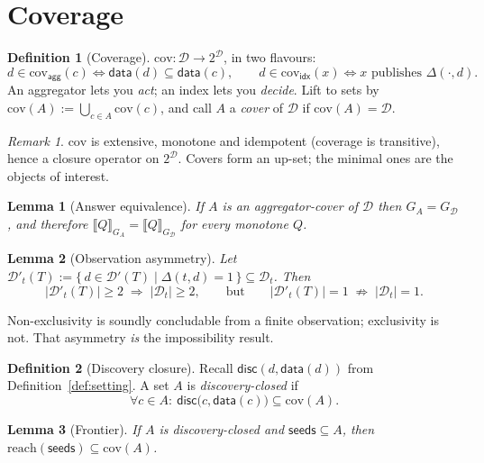 \documentclass[11pt,a4paper]{article}
\theoremstyle{definition}
\newtheorem{definition}{Definition}
\theoremstyle{plain}
\newtheorem{lemma}{Lemma}
\theoremstyle{remark}
\newtheorem*{remark}{Remark}
\newcommand{\Dd}{\mathcal{D}}
\newcommand{\dataf}{\mathsf{data}}
\newcommand{\disc}{\mathsf{disc}}
\newcommand{\ev}[2]{\llbracket #1 \rrbracket_{#2}}
\begin{document}
\section{Coverage}

\begin{definition}[Coverage]
$\mathrm{cov} : \Dd \to 2^{\Dd}$, in two flavours:
\[
  d \in \mathrm{cov}_{\mathsf{agg}}(c) \iff \dataf(d) \subseteq \dataf(c),
  \qquad
  d \in \mathrm{cov}_{\mathsf{idx}}(x) \iff x \text{ publishes } \Delta(\cdot,d).
\]
An aggregator lets you \emph{act}; an index lets you \emph{decide}. Lift to sets by
$\mathrm{cov}(A) := \bigcup_{c \in A}\mathrm{cov}(c)$, and call $A$ a \emph{cover} of
$\Dd$ if $\mathrm{cov}(A) = \Dd$.
\end{definition}

\begin{remark}
$\mathrm{cov}$ is extensive, monotone and idempotent (coverage is transitive), hence a
closure operator on $2^{\Dd}$. Covers form an up-set; the minimal ones are the objects
of interest.
\end{remark}

\begin{lemma}[Answer equivalence]
If $A$ is an aggregator-cover of $\Dd$ then $G_A = G_{\Dd}$, and therefore
$\ev{Q}{G_A} = \ev{Q}{G_{\Dd}}$ for every monotone $Q$.
\end{lemma}

\begin{lemma}[Observation asymmetry]
Let $\Dd'_t(T) := \{\, d \in \Dd'(T) \mid \Delta(t,d) = 1 \,\} \subseteq \Dd_t$. Then
\[
  |\Dd'_t(T)| \geq 2 \;\Longrightarrow\; |\Dd_t| \geq 2,
  \qquad\text{but}\qquad
  |\Dd'_t(T)| = 1 \;\not\Longrightarrow\; |\Dd_t| = 1 .
\]
\end{lemma}

\noindent
Non-exclusivity is soundly concludable from a finite observation; exclusivity is not.
That asymmetry \emph{is} the impossibility result.

\begin{definition}[Discovery closure]
Recall $\disc(d, \dataf(d))$ from Definition~\ref{def:setting}. A set $A$ is
\emph{discovery-closed} if
\[
  \forall c \in A : \ \disc\bigl(c, \dataf(c)\bigr) \subseteq \mathrm{cov}(A).
\]
\end{definition}

\begin{lemma}[Frontier]
If $A$ is discovery-closed and $\mathsf{seeds} \subseteq A$, then
$\mathrm{reach}(\mathsf{seeds}) \subseteq \mathrm{cov}(A)$.
\end{lemma}
\end{document}
